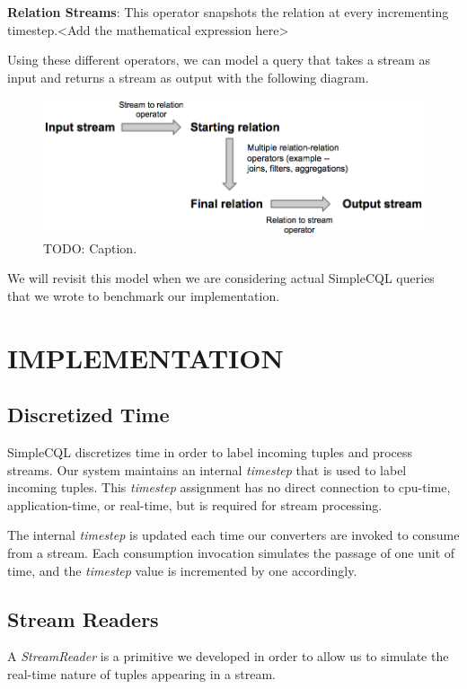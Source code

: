 \documentclass[a4paper, 10pt, conference]{IEEEconf}
\begin{document}
\textbf{Relation Streams}: This operator snapshots the relation at every incrementing timestep.<Add the mathematical expression here>


Using these different operators, we can model a query that takes a stream as input and returns a stream as output with the following diagram.

\begin{figure}[tpH]
    \centering
    \centerline{\includegraphics[totalheight=2.5cm]{operators.png}}
    \caption{TODO: Caption.}
    \label{fig:operators}
\end{figure}

We will revisit this model when we are considering actual SimpleCQL queries that we wrote to benchmark our implementation.


\section{IMPLEMENTATION}

\subsection{Discretized Time}
SimpleCQL discretizes time in order to label incoming tuples and process streams. Our system maintains an internal \textit{timestep} that is used to label incoming tuples. This \textit{timestep} assignment has no direct connection to cpu-time, application-time, or real-time, but is required for stream processing.

The internal \textit{timestep} is updated each time our converters are invoked to consume from a stream. Each consumption invocation simulates the passage of one unit of time, and the \textit{timestep} value is incremented by one accordingly. 

\subsection{Stream Readers}
A \textit{StreamReader} is a primitive we developed in order to allow us to simulate the real-time nature of tuples appearing in a stream.
\end{document}

